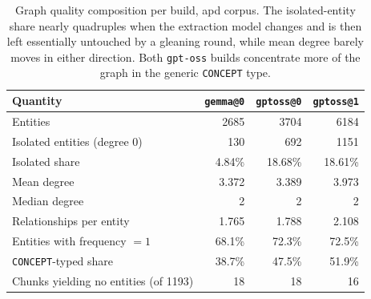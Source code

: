 \begin{table}[htbp]
  \centering
  \caption{Graph quality composition per build, apd corpus. The isolated-entity share nearly
    quadruples when the extraction model changes and is then left essentially untouched by a
    gleaning round, while mean degree barely moves in either direction. Both \texttt{gpt-oss}
    builds concentrate more of the graph in the generic \texttt{CONCEPT} type.}
  \label{tab:graph-composition}
  \begin{tabular}{lrrr}
    \toprule
    Quantity & \texttt{gemma@0} & \texttt{gptoss@0} & \texttt{gptoss@1} \\
    \midrule
    Entities                              &  2685 &  3704 &  6184 \\
    Isolated entities (degree 0)          &   130 &   692 &  1151 \\
    Isolated share                        & 4.84\% & 18.68\% & 18.61\% \\
    \midrule
    Mean degree                           & 3.372 & 3.389 & 3.973 \\
    Median degree                         &     2 &     2 &     2 \\
    Relationships per entity              & 1.765 & 1.788 & 2.108 \\
    \midrule
    Entities with frequency $=1$          & 68.1\% & 72.3\% & 72.5\% \\
    \texttt{CONCEPT}-typed share          & 38.7\% & 47.5\% & 51.9\% \\
    Chunks yielding no entities (of 1193) &    18 &    18 &    16 \\
    \bottomrule
  \end{tabular}
\end{table}
